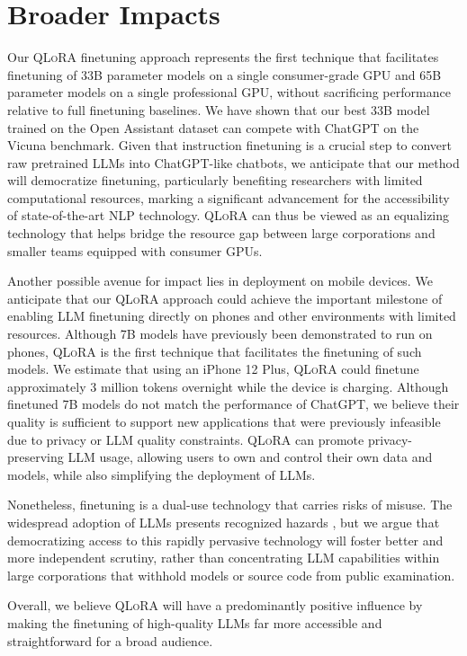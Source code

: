 \section{Broader Impacts}

Our \textsc{QLoRA} finetuning approach represents the first technique that facilitates finetuning of 33B parameter models on a single consumer-grade GPU and 65B parameter models on a single professional GPU, without sacrificing performance relative to full finetuning baselines. We have shown that our best 33B model trained on the Open Assistant dataset can compete with ChatGPT on the Vicuna benchmark. Given that instruction finetuning is a crucial step to convert raw pretrained LLMs into ChatGPT-like chatbots, we anticipate that our method will democratize finetuning, particularly benefiting researchers with limited computational resources, marking a significant advancement for the accessibility of state-of-the-art NLP technology. \textsc{QLoRA} can thus be viewed as an equalizing technology that helps bridge the resource gap between large corporations and smaller teams equipped with consumer GPUs.

Another possible avenue for impact lies in deployment on mobile devices. We anticipate that our \textsc{QLoRA} approach could achieve the important milestone of enabling LLM finetuning directly on phones and other environments with limited resources. Although 7B models have previously been demonstrated to run on phones, \textsc{QLoRA} is the first technique that facilitates the finetuning of such models. We estimate that using an iPhone 12 Plus, \textsc{QLoRA} could finetune approximately 3 million tokens overnight while the device is charging. Although finetuned 7B models do not match the performance of ChatGPT, we believe their quality is sufficient to support new applications that were previously infeasible due to privacy or LLM quality constraints. \textsc{QLoRA} can promote privacy-preserving LLM usage, allowing users to own and control their own data and models, while also simplifying the deployment of LLMs.

Nonetheless, finetuning is a dual-use technology that carries risks of misuse. The widespread adoption of LLMs presents recognized hazards \citep{bommasani2021opportunities,bender2021dangers}, but we argue that democratizing access to this rapidly pervasive technology will foster better and more independent scrutiny, rather than concentrating LLM capabilities within large corporations that withhold models or source code from public examination.

Overall, we believe \textsc{QLoRA} will have a predominantly positive influence by making the finetuning of high-quality LLMs far more accessible and straightforward for a broad audience.

